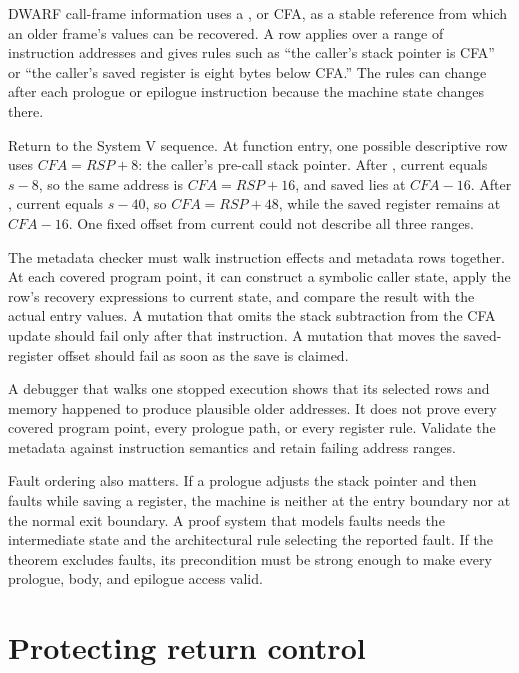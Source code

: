 DWARF call-frame information uses a
, or CFA, as a stable reference from which an
older frame's values can be recovered. A row applies over a range of instruction
addresses and gives rules such as ``the caller's stack pointer is CFA'' or
``the caller's saved register is eight bytes below CFA.'' The rules can change
after each prologue or epilogue instruction because the machine state changes
there.

Return to the System V sequence. At function entry, one possible descriptive
row uses \(CFA=RSP+8\): the caller's pre-call stack pointer. After
, current  equals \(s-8\), so the same address is
\(CFA=RSP+16\), and saved  lies at \(CFA-16\). After
, current  equals \(s-40\), so \(CFA=RSP+48\), while the
saved register remains at \(CFA-16\). One fixed offset from current 
could not describe all three ranges.

The metadata checker must walk instruction effects and metadata rows together.
At each covered program point, it can construct a symbolic caller state,
apply the row's recovery expressions to current state, and compare the result
with the actual entry values. A mutation that omits the stack subtraction from
the CFA update should fail only after that instruction. A mutation that moves
the saved-register offset should fail as soon as the save is claimed.

\begin{warning}[title={A successful backtrace is one witness}]
A debugger that walks one stopped execution shows that its selected rows and
memory happened to produce plausible older addresses. It does not prove every
covered program point, every prologue path, or every register rule. Validate
the metadata against instruction semantics and retain failing address ranges.
\end{warning}

Fault ordering also matters. If a prologue adjusts the stack pointer and then
faults while saving a register, the machine is neither at the entry boundary
nor at the normal exit boundary. A proof system that models faults needs the
intermediate state and the architectural rule selecting the reported fault.
If the theorem excludes faults, its precondition must be strong enough to make
every prologue, body, and epilogue access valid.

\section{Protecting return control}

